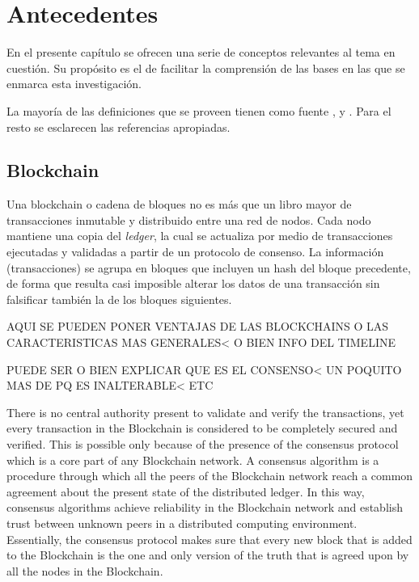 \chapter{Antecedentes}\label{chapter:state-of-the-art}

En el presente cap\'itulo se ofrecen una serie de conceptos relevantes al tema en cuesti\'on. Su prop\'osito es el de facilitar la comprensi\'on de las bases en las que se enmarca esta investigaci\'on. %

La mayor\'ia de las definiciones que se proveen tienen como fuente \cite{hyperledgerPaper}, \cite{Hyperledgerdoc} y \cite{HyperledgerdocCA}. Para el resto se esclarecen las referencias apropiadas.%

\section{Blockchain}

Una blockchain o cadena de bloques no es m\'as que un libro mayor de transacciones inmutable y distribuido entre una red de nodos. Cada nodo mantiene una copia del \emph{ledger}, la cual se actualiza por medio de transacciones ejecutadas y validadas a partir de un protocolo de consenso. La informaci\'on (transacciones) se agrupa en bloques que incluyen un hash del bloque precedente, de forma que resulta casi imposible alterar los datos de una transacci\'on sin falsificar tambi\'en la de los bloques siguientes.

AQUI SE PUEDEN PONER VENTAJAS DE LAS BLOCKCHAINS O LAS CARACTERISTICAS MAS GENERALES< O BIEN INFO DEL TIMELINE 

PUEDE SER O BIEN EXPLICAR QUE ES EL CONSENSO< UN POQUITO MAS DE PQ ES INALTERABLE< ETC


There is no central authority present to validate and verify the transactions, yet every transaction in the Blockchain is considered to be completely secured and verified. This is possible only because of the presence of the consensus protocol which is a core part of any Blockchain network. A consensus algorithm is a procedure through which all the peers of the Blockchain network reach a common agreement about the present state of the distributed ledger. In this way, consensus algorithms achieve reliability in the Blockchain network and establish trust between unknown peers in a distributed computing environment. Essentially, the consensus protocol makes sure that every new block that is added to the Blockchain is the one and only version of the truth that is agreed upon by all the nodes in the Blockchain. 

